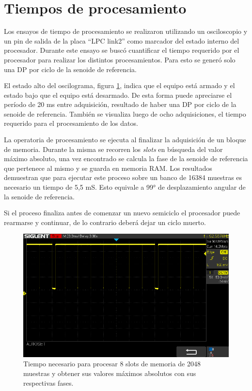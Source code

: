 \vspace{5mm}

\section{Tiempos de procesamiento}
Los ensayos de tiempo de procesamiento se realizaron utilizando un osciloscopio y un pin de salida de la placa \enquote{LPC link2} como marcador del estado interno del procesador. Durante este ensayo se buscó cuantificar el tiempo requerido por el procesador para realizar los distintos procesamientos. Para esto se generó solo una DP por ciclo de la senoide de referencia. 

El estado alto del oscilograma, figura \ref{fig:tiempoSavePatron}, indica que el equipo está armado y el estado bajo que el equipo está desarmado. De esta forma puede apreciarse el período de 20 ms entre adquisición, resultado de haber una DP por ciclo de la senoide de referencia. También se visualiza luego de ocho adquisiciones, el tiempo requerido para el procesamiento de los datos. 

La operatoria de procesamiento se ejecuta al finalizar la adquisición de un bloque de memoria. Durante la misma se recorren los \textit{slots} en búsqueda del valor máximo absoluto, una vez encontrado se calcula la fase de la senoide de referencia que pertenece al mismo y se guarda en memoria RAM. Los resultados demuestran que para ejecutar este proceso sobre un banco de 16384 muestras es necesario un tiempo de 5,5 mS. Esto equivale a 99° de desplazamiento angular de la senoide de referencia. 

Si el proceso finaliza antes de comenzar un nuevo semiciclo el procesador puede rearmarse y continuar, de lo contrario deberá dejar un ciclo muerto.

\newpage


\begin{figure}[ht]
	\centering
	\includegraphics[width=133mm]{./Figures/tiempoSavePatron.png}
	\caption{Tiempo necesario para procesar 8 slots de memoria de 2048 muestras y obtener sus valores máximos absolutos con sus respectivas fases.}
	\label{fig:tiempoSavePatron}
\end{figure}

